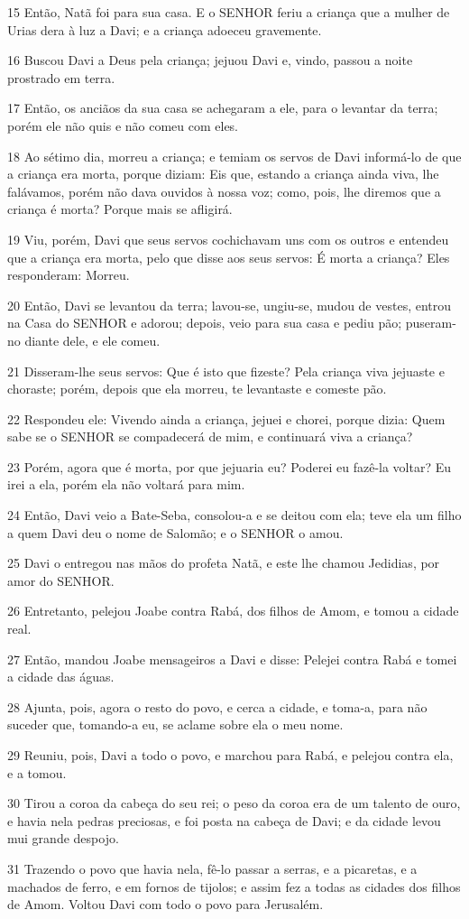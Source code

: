 \par 15 Então, Natã foi para sua casa. E o SENHOR feriu a criança que a mulher de Urias dera à luz a Davi; e a criança adoeceu gravemente.
\par 16 Buscou Davi a Deus pela criança; jejuou Davi e, vindo, passou a noite prostrado em terra.
\par 17 Então, os anciãos da sua casa se achegaram a ele, para o levantar da terra; porém ele não quis e não comeu com eles.
\par 18 Ao sétimo dia, morreu a criança; e temiam os servos de Davi informá-lo de que a criança era morta, porque diziam: Eis que, estando a criança ainda viva, lhe falávamos, porém não dava ouvidos à nossa voz; como, pois, lhe diremos que a criança é morta? Porque mais se afligirá.
\par 19 Viu, porém, Davi que seus servos cochichavam uns com os outros e entendeu que a criança era morta, pelo que disse aos seus servos: É morta a criança? Eles responderam: Morreu.
\par 20 Então, Davi se levantou da terra; lavou-se, ungiu-se, mudou de vestes, entrou na Casa do SENHOR e adorou; depois, veio para sua casa e pediu pão; puseram-no diante dele, e ele comeu.
\par 21 Disseram-lhe seus servos: Que é isto que fizeste? Pela criança viva jejuaste e choraste; porém, depois que ela morreu, te levantaste e comeste pão.
\par 22 Respondeu ele: Vivendo ainda a criança, jejuei e chorei, porque dizia: Quem sabe se o SENHOR se compadecerá de mim, e continuará viva a criança?
\par 23 Porém, agora que é morta, por que jejuaria eu? Poderei eu fazê-la voltar? Eu irei a ela, porém ela não voltará para mim.
\par 24 Então, Davi veio a Bate-Seba, consolou-a e se deitou com ela; teve ela um filho a quem Davi deu o nome de Salomão; e o SENHOR o amou.
\par 25 Davi o entregou nas mãos do profeta Natã, e este lhe chamou Jedidias, por amor do SENHOR.
\par 26 Entretanto, pelejou Joabe contra Rabá, dos filhos de Amom, e tomou a cidade real.
\par 27 Então, mandou Joabe mensageiros a Davi e disse: Pelejei contra Rabá e tomei a cidade das águas.
\par 28 Ajunta, pois, agora o resto do povo, e cerca a cidade, e toma-a, para não suceder que, tomando-a eu, se aclame sobre ela o meu nome.
\par 29 Reuniu, pois, Davi a todo o povo, e marchou para Rabá, e pelejou contra ela, e a tomou.
\par 30 Tirou a coroa da cabeça do seu rei; o peso da coroa era de um talento de ouro, e havia nela pedras preciosas, e foi posta na cabeça de Davi; e da cidade levou mui grande despojo.
\par 31 Trazendo o povo que havia nela, fê-lo passar a serras, e a picaretas, e a machados de ferro, e em fornos de tijolos; e assim fez a todas as cidades dos filhos de Amom. Voltou Davi com todo o povo para Jerusalém.

